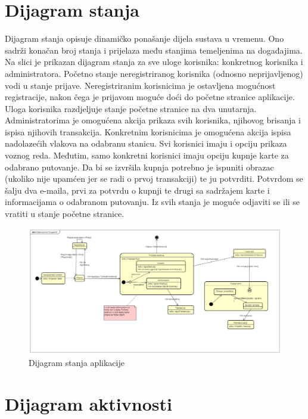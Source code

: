\section{Dijagram stanja}
			{Dijagram stanja opisuje dinamičko ponašanje dijela sustava u vremenu. Ono sadrži konačan broj stanja i prijelaza među stanjima temeljenima na događajima. Na slici je prikazan dijagram stanja za sve uloge korisnika: konkretnog korisnika i administratora. Početno stanje neregistriranog korisnika (odnosno neprijavljenog) vodi u stanje prijave. Neregistriranim korisnicima je ostavljena mogućnost registracije, nakon čega je prijavom moguće doći do početne stranice aplikacije. Uloga korisnika razdjeljuje stanje početne stranice na dva unutarnja. Administratorima je omogućena akcija prikaza svih korisnika, njihovog brisanja i ispisa njihovih transakcija. Konkretnim korisnicima je omogućena akcija ispisa nadolazećih vlakova na odabranu stanicu. Svi korisnici imaju i opciju prikaza voznog reda. Međutim, samo konkretni korisnici imaju opciju kupnje karte za odabrano putovanje. Da bi se izvršila kupnja potrebno je ispuniti obrazac (ukoliko nije upamćen jer se radi o prvoj transakciji) te ju potvrditi. Potvrdom se šalju dva e-maila, prvi za potvrdu o kupnji te drugi sa sadržajem karte i informacijama o odabranom putovanju. Iz svih stanja je moguće odjaviti se ili se vratiti u stanje početne stranice. } 
			
				\begin{figure}[H]
					\centering
					\includegraphics[width=1\linewidth]{"slike/StateMachineDiagram.png"}
					\caption{Dijagram stanja aplikacije}
					\label{fig:dij-state}
				\end{figure}
			
			
			\eject 
		
\section{Dijagram aktivnosti}

